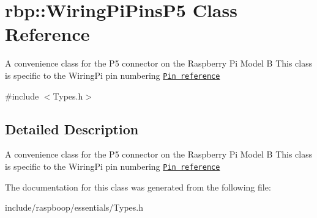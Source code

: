 \hypertarget{classrbp_1_1WiringPiPinsP5}{}\section{rbp\+:\+:Wiring\+Pi\+Pins\+P5 Class Reference}
\label{classrbp_1_1WiringPiPinsP5}


A convenience class for the P5 connector on the Raspberry Pi Model B This class is specific to the Wiring\+Pi pin numbering \href{http://wiringpi.com/pins/}{\tt Pin reference}  




{\ttfamily \#include $<$Types.\+h$>$}



\subsection{Detailed Description}
A convenience class for the P5 connector on the Raspberry Pi Model B This class is specific to the Wiring\+Pi pin numbering \href{http://wiringpi.com/pins/}{\tt Pin reference} 

The documentation for this class was generated from the following file\+:\begin{DoxyCompactItemize}
\item 
include/raspboop/essentials/Types.\+h\end{DoxyCompactItemize}
